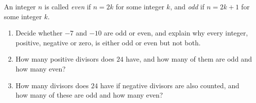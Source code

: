 An integer $n$ is called \emph{even} if $n=2k$ for some integer $k$, and \emph{odd} if $n=2k+1$ for some integer $k$.
\begin{enumerate}
\item[(a)] Decide whether $-7$ and $-10$ are odd or even, and explain why every integer, positive, negative or zero, is either odd or even but not both.
\item[(b)] How many positive divisors does $24$ have, and how many of them are odd and how many even?
\item[(c)] How many divisors does $24$ have if negative divisors are also counted, and how many of these are odd and how many even?
\end{enumerate}

